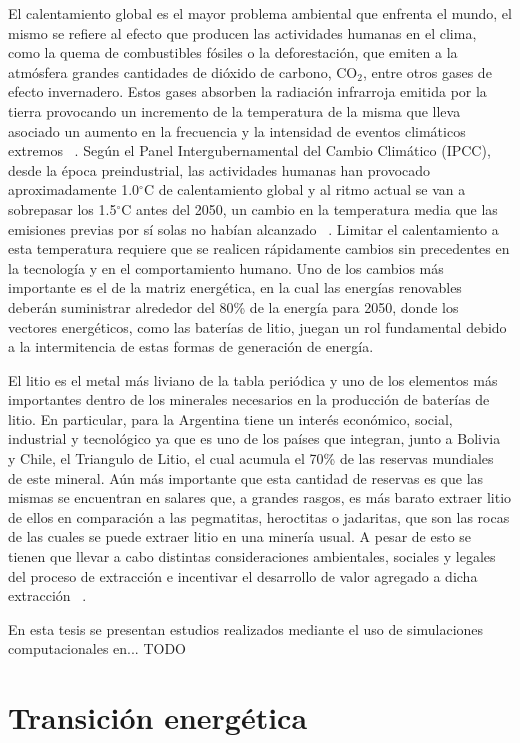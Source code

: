 El calentamiento global es el mayor problema ambiental que enfrenta el mundo, el 
mismo se refiere al efecto que producen las actividades humanas en el clima, como 
la quema de combustibles fósiles o la deforestación, que emiten a la atmósfera
grandes cantidades de dióxido de carbono, CO$_2$, entre otros gases de efecto 
invernadero. Estos gases absorben la radiación infrarroja emitida por la tierra 
provocando un incremento de la temperatura de la misma que lleva asociado un 
aumento en la frecuencia y la intensidad de eventos climáticos extremos 
~\cite{houghton2005}. Según el Panel Intergubernamental del Cambio Climático 
(IPCC), desde la época preindustrial, las actividades humanas han provocado 
aproximadamente 1.0$^{\circ}$C de calentamiento global y al ritmo actual se van 
a sobrepasar los 1.5$^{\circ}$C antes del 2050, un cambio en la temperatura
media que las emisiones previas por sí solas no habían alcanzado
~\cite{harvey2018}. Limitar el calentamiento a esta temperatura requiere que se 
realicen rápidamente cambios sin precedentes en la tecnología y en el 
comportamiento humano. Uno de los cambios más importante es el de la matriz 
energética, en la cual las energías renovables deberán suministrar alrededor del 
80\% de la energía para 2050, donde los vectores energéticos, como las baterías 
de litio, juegan un rol fundamental debido a la intermitencia de estas formas de 
generación de energía.

El litio es el metal más liviano de la tabla periódica y uno de los elementos más
importantes dentro de los minerales necesarios en la producción de baterías de
litio. En particular, para la Argentina tiene un interés económico, social, 
industrial y tecnológico ya que es uno de los países que integran, junto a 
Bolivia y Chile, el Triangulo de Litio, el cual acumula el 70\% de las reservas 
mundiales de este mineral. Aún más importante que esta cantidad de reservas es 
que las mismas se encuentran en salares que, a grandes rasgos, es más barato
extraer litio de ellos en comparación a las pegmatitas, heroctitas o jadaritas, 
que son las rocas de las cuales se puede extraer litio en una minería usual.
A pesar de esto se tienen que llevar a cabo distintas consideraciones ambientales,
sociales y legales del proceso de extracción e incentivar el desarrollo de valor
agregado a dicha extracción ~\cite{heredia2020}.

En esta tesis se presentan estudios realizados mediante el uso de simulaciones 
computacionales en... TODO


\section{Transición energética}

